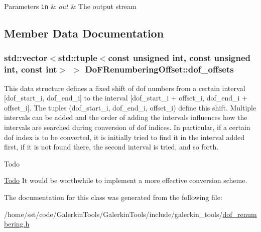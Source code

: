 \begin{DoxyParams}[1]{Parameters}
\mbox{\tt in}  & {\em out} & The output stream \\
\hline
\end{DoxyParams}


\subsection{Member Data Documentation}
\subsubsection[{\texorpdfstring{dof\+\_\+offsets}{dof_offsets}}]{\setlength{\rightskip}{0pt plus 5cm}std\+::vector$<$std\+::tuple$<$const unsigned int, const unsigned int, const int$>$ $>$ Do\+F\+Renumbering\+Offset\+::dof\+\_\+offsets\hspace{0.3cm}{\ttfamily [private]}}\hypertarget{class_do_f_renumbering_offset_a5df6c4b70b1394c3670ced634146c9a9}{}\label{class_do_f_renumbering_offset_a5df6c4b70b1394c3670ced634146c9a9}
This data structure defines a fixed shift of dof numbers from a certain interval \mbox{[}dof\+\_\+start\+\_\+i, dof\+\_\+end\+\_\+i\mbox{]} to the interval \mbox{[}dof\+\_\+start\+\_\+i + offset\+\_\+i, dof\+\_\+end\+\_\+i + offset\+\_\+i\mbox{]}. The tuples (dof\+\_\+start\+\_\+i, dof\+\_\+end\+\_\+i, offset\+\_\+i) define this shift. Multiple intervals can be added and the order of adding the intervals influences how the intervals are searched during conversion of dof indices. In particular, if a certain dof index is to be converted, it is initially tried to find it in the interval added first, if it is not found there, the second interval is tried, and so forth.\begin{DoxyRefDesc}{Todo}
\item[\hyperlink{todo__todo000009}{Todo}]It would be worthwhile to implement a more effective conversion scheme. \end{DoxyRefDesc}


The documentation for this class was generated from the following file\+:\begin{DoxyCompactItemize}
\item 
/home/sst/code/\+Galerkin\+Tools/\+Galerkin\+Tools/include/galerkin\+\_\+tools/\hyperlink{dof__renumbering_8h}{dof\+\_\+renumbering.\+h}\end{DoxyCompactItemize}
